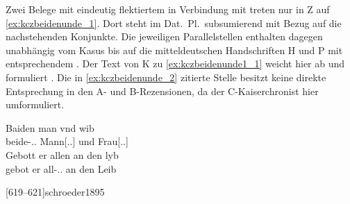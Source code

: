 Zwei Belege mit eindeutig flektiertem  in Verbindung mit
 treten nur in Z auf \cref{ex:kczbeidenunde_1}. Dort
steht  im Dat.\ Pl.\ subsumierend mit Bezug auf die nachstehenden
Konjunkte. Die jeweiligen Parallelstellen enthalten dagegen unabhängig vom
Kasus  bis auf die mitteldeutschen Handschriften H und
P mit entsprechendem . Der Text von K zu
\cref{ex:kczbeidenunde1_1} weicht hier ab und formuliert
 
\autocite[\pno~3va,22]{kc:K}. Die in \cref{ex:kczbeidenunde_2} zitierte Stelle
besitzt keine direkte Entsprechung in den A- und B-Rezensionen, da der
C-Kaiserchronist hier umformuliert.

\begin{exe}
\ex \label{ex:kczbeidenunde_1}
	\begin{xlist}
	\ex \label{ex:kczbeidenunde1_1}
		\gll Baiden man vnd wib \\
			beide-\Dat.\Pl\subMF.\St{} Mann[\Dat.\Sg.\MascM] und
				Frau[\Dat.\Sg.\NeutF] \\
	\sn \gll Gebott er allen an den lyb \\
			gebot er all-\Dat.\Pl\subMF.\St{} an den Leib \\
		\begin{taggedline}{%
			\parencites[\pno~10va,9--10]{kc:Z}[vgl.]%
			[\pno~3va,19--20]{kc:C1}%
			[\pno~3va,22--23]{kc:K}%
			[abweichend][\pno~3va,1--2]{kc:A1}%
			[\pno~5va,16--17]{kc:M}%
			[\pno~3vb,10--12]{kc:H}%
			[\pno~3vc,51--53]{kc:B1}%
			[\pno~3vb,5--7]{kc:VB}%
			[\pno~6ra,8--10]{kc:P}%
			[619--621]{schroeder1895}}
		\trans {}
		\end{taggedline}



\end{xlist}
\end{exe}
